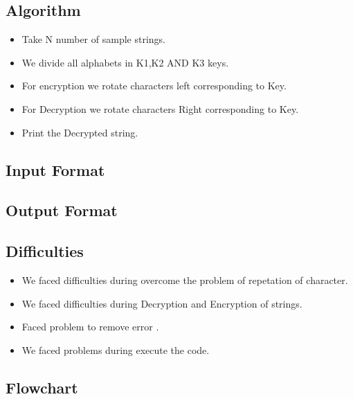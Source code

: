 \documentclass[12pt]{article}
\begin{document}
\subsection{Algorithm}
\begin{itemize}
\item Take N number of sample strings.
\item  We  divide all alphabets in K1,K2 AND K3 keys.
\item For encryption  we rotate characters  left corresponding to Key.
\item For Decryption  we rotate characters  Right corresponding to Key.

\item Print the Decrypted string.
 
\end{itemize}






\subsection{Input Format}


\subsection{Output Format}

\subsection{Difficulties}
\begin{itemize}
\item We faced difficulties during overcome the problem of repetation of character. 
\item We faced difficulties during Decryption and Encryption  of strings.
\item Faced problem to remove error .
\item We faced problems during execute the code.
\end{itemize}

\subsection{Flowchart}
\end{document}
